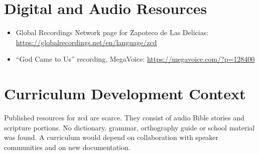 \documentclass[12pt]{article}
\begin{document}
\section{Digital and Audio Resources}
\begin{itemize}
\item Global Recordings Network page for Zapoteco de Las Delicias: \url{https://globalrecordings.net/en/language/zcd}
\item ``God Came to Us'' recording, MegaVoice: \url{https://megavoice.com/?p=128400}
\end{itemize}

\section{Curriculum Development Context}
Published resources for zcd are scarce. They consist of audio Bible stories and scripture portions. No dictionary, grammar, orthography guide or school material was found. A curriculum would depend on collaboration with speaker communities and on new documentation.
\end{document}
